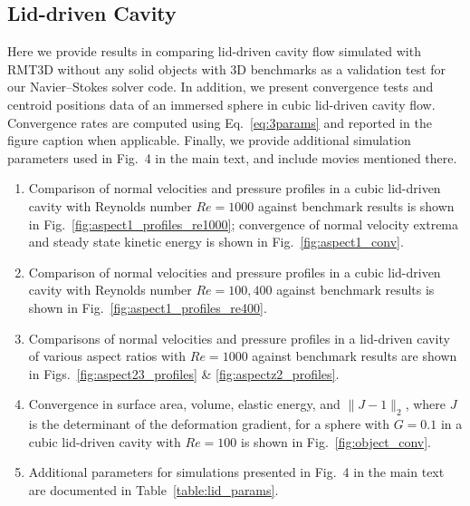 \documentclass[times, 10pt]{article}
\newcommand{\Rey}{\textit{Re}}
\begin{document}
	\subsection{Lid-driven Cavity} Here we provide results in comparing lid-driven cavity flow simulated with RMT3D without any solid objects with 3D benchmarks as a validation test for our Navier--Stokes solver code.
	In addition, we present convergence tests and centroid positions data of an immersed sphere in cubic lid-driven cavity flow.
	Convergence rates are computed using Eq.~\eqref{eq:3params} and reported in the figure caption when applicable.
	Finally, we provide additional simulation parameters used in Fig.~4 in the main text, and include movies mentioned there.
	\begin{enumerate}
		\item Comparison of normal velocities and pressure profiles in a cubic lid-driven cavity with Reynolds number $\Rey=1000$ against benchmark results is shown in Fig.~\ref{fig:aspect1_profiles_re1000}; convergence of normal velocity extrema and steady state kinetic energy is shown in Fig.~\ref{fig:aspect1_conv}.

		\item Comparison of normal velocities and pressure profiles in a cubic lid-driven cavity with Reynolds number $\Rey=100, 400$ against benchmark results is shown in Fig.~\ref{fig:aspect1_profiles_re400}.

        \item Comparisons of normal velocities and pressure profiles in a lid-driven cavity of various aspect ratios with $\Rey=1000$ against benchmark results are shown in Figs.~\ref{fig:aspect23_profiles} \& \ref{fig:aspectz2_profiles}.

		\item Convergence in surface area, volume, elastic energy,  and $\|J-1\|_2$, where $J$ is the determinant of the deformation gradient, for a sphere with $G=0.1$ in a cubic lid-driven cavity with $\Rey=100$ is shown in Fig.~\ref{fig:object_conv}.

		\item Additional parameters for simulations presented in Fig.~4 in the main text are documented in Table~\ref{table:lid_params}.


\end{enumerate}
\end{document}
